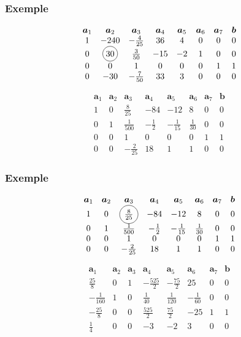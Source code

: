 \documentclass[t,usepdftitle=false]{beamer}
\newcommand*\circled[1]{\tikz[baseline=(char.base)]{
    \node[shape=circle,draw,inner sep=2pt] (char) {#1};}}
\def\ba{\boldsymbol{a}}
\def\bb{\boldsymbol{b}}
\begin{document}
\begin{frame}
	\frametitle{Exemple}
	
	\[
	\begin{matrix}
		\ba_1 & \ba_2 & \ba_3 & \ba_4 & \ba_5 &\ba_6 &\ba_7 & \bb \\
		1 & -240 & -\frac{4}{25} & 36 & 4 & 0 & 0 & 0 \\
		0 & \circled{30} & \frac{3}{50} & -15 & -2 & 1 & 0 & 0 \\
		0 & 0 & 1 & 0 & 0 & 0 & 1 & 1 \\
		0 & -30 & -\frac{7}{50} & 33 & 3 & 0 & 0 & 0
	\end{matrix}
	\]
	
	\[
	\begin{matrix}
		\ba_1 & \ba_2 & \ba_3 & \ba_4 & \ba_5 &\ba_6 &\ba_7 & \bb \\
		1 & 0 & \frac{8}{25} & -84 & -12 & 8 & 0 & 0 \\
		0 & 1 & \frac{1}{500} & -\frac{1}{2} & -\frac{1}{15} & \frac{1}{30} & 0 & 0 \\
		0 & 0 & 1 & 0 & 0 & 0 & 1 & 1 \\
		0 & 0 & -\frac{2}{25} & 18 & 1 & 1 & 0 & 0
	\end{matrix}
	\]
	
\end{frame}

\begin{frame}
	\frametitle{Exemple}
	
	\[
	\begin{matrix}
		\ba_1 & \ba_2 & \ba_3 & \ba_4 & \ba_5 &\ba_6 &\ba_7 & \bb \\
		1 & 0 & \circled{$\frac{8}{25}$} & -84 & -12 & 8 & 0 & 0 \\
		0 & 1 & \frac{1}{500} & -\frac{1}{2} & -\frac{1}{15} & \frac{1}{30} & 0 & 0 \\
		0 & 0 & 1 & 0 & 0 & 0 & 1 & 1 \\
		0 & 0 & -\frac{2}{25} & 18 & 1 & 1 & 0 & 0
	\end{matrix}
	\]
	
	\[
	\begin{matrix}
		\ba_1 & \ba_2 & \ba_3 & \ba_4 & \ba_5 &\ba_6 &\ba_7 & \bb \\
		\frac{25}{8} & 0 & 1 & -\frac{525}{2} & -\frac{75}{2} & 25 & 0 & 0 \\
		-\frac{1}{160} & 1 & 0 & \frac{1}{40} & \frac{1}{120} & -\frac{1}{60} & 0 & 0 \\
		-\frac{25}{8} & 0 & 0 & \frac{525}{2} & \frac{75}{2} & -25 & 1 & 1 \\
		\frac{1}{4} & 0 & 0 & -3 & -2 & 3 & 0 & 0
	\end{matrix}
	\]
	
\end{frame}
\end{document}
